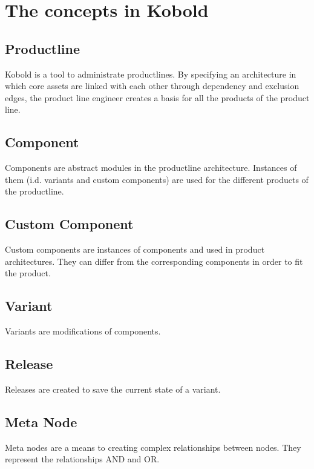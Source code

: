 \chapter{The concepts in Kobold}

\section{Productline}

Kobold is a tool to administrate productlines. By specifying an architecture in which
core assets are linked with each other through dependency and exclusion edges, the product line engineer
creates a basis for all the products of the product line. 

\section{Component}

Components are abstract modules in the productline architecture. Instances of them (i.d. variants and custom components)
are used for the different products of the productline.

\section{Custom Component}

Custom components are instances of components and used in product architectures. They can
differ from the corresponding components in order to fit the product.

\section{Variant}

Variants are modifications of components.

\section{Release}

Releases are created to save the current state of a variant. 

\section{Meta Node}

Meta nodes are a means to creating complex relationships between nodes. They represent
the relationships AND and OR.

